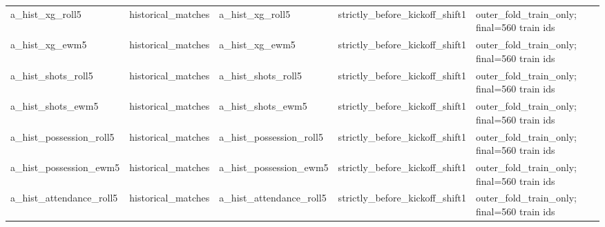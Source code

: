 {\begin{longtable}{p{}p{}p{}p{}p{}}
a\_\allowbreak{}hist\_\allowbreak{}xg\_\allowbreak{}roll5 & historical\_\allowbreak{}matches & a\_\allowbreak{}hist\_\allowbreak{}xg\_\allowbreak{}roll5 & strictly\_\allowbreak{}before\_\allowbreak{}kickoff\_\allowbreak{}shift1 & outer\_\allowbreak{}fold\_\allowbreak{}train\_\allowbreak{}only;\allowbreak{} final=560 train ids \\
a\_\allowbreak{}hist\_\allowbreak{}xg\_\allowbreak{}ewm5 & historical\_\allowbreak{}matches & a\_\allowbreak{}hist\_\allowbreak{}xg\_\allowbreak{}ewm5 & strictly\_\allowbreak{}before\_\allowbreak{}kickoff\_\allowbreak{}shift1 & outer\_\allowbreak{}fold\_\allowbreak{}train\_\allowbreak{}only;\allowbreak{} final=560 train ids \\
a\_\allowbreak{}hist\_\allowbreak{}shots\_\allowbreak{}roll5 & historical\_\allowbreak{}matches & a\_\allowbreak{}hist\_\allowbreak{}shots\_\allowbreak{}roll5 & strictly\_\allowbreak{}before\_\allowbreak{}kickoff\_\allowbreak{}shift1 & outer\_\allowbreak{}fold\_\allowbreak{}train\_\allowbreak{}only;\allowbreak{} final=560 train ids \\
a\_\allowbreak{}hist\_\allowbreak{}shots\_\allowbreak{}ewm5 & historical\_\allowbreak{}matches & a\_\allowbreak{}hist\_\allowbreak{}shots\_\allowbreak{}ewm5 & strictly\_\allowbreak{}before\_\allowbreak{}kickoff\_\allowbreak{}shift1 & outer\_\allowbreak{}fold\_\allowbreak{}train\_\allowbreak{}only;\allowbreak{} final=560 train ids \\
a\_\allowbreak{}hist\_\allowbreak{}possession\_\allowbreak{}roll5 & historical\_\allowbreak{}matches & a\_\allowbreak{}hist\_\allowbreak{}possession\_\allowbreak{}roll5 & strictly\_\allowbreak{}before\_\allowbreak{}kickoff\_\allowbreak{}shift1 & outer\_\allowbreak{}fold\_\allowbreak{}train\_\allowbreak{}only;\allowbreak{} final=560 train ids \\
a\_\allowbreak{}hist\_\allowbreak{}possession\_\allowbreak{}ewm5 & historical\_\allowbreak{}matches & a\_\allowbreak{}hist\_\allowbreak{}possession\_\allowbreak{}ewm5 & strictly\_\allowbreak{}before\_\allowbreak{}kickoff\_\allowbreak{}shift1 & outer\_\allowbreak{}fold\_\allowbreak{}train\_\allowbreak{}only;\allowbreak{} final=560 train ids \\
a\_\allowbreak{}hist\_\allowbreak{}attendance\_\allowbreak{}roll5 & historical\_\allowbreak{}matches & a\_\allowbreak{}hist\_\allowbreak{}attendance\_\allowbreak{}roll5 & strictly\_\allowbreak{}before\_\allowbreak{}kickoff\_\allowbreak{}shift1 & outer\_\allowbreak{}fold\_\allowbreak{}train\_\allowbreak{}only;\allowbreak{} final=560 train ids \\

\end{longtable}}
